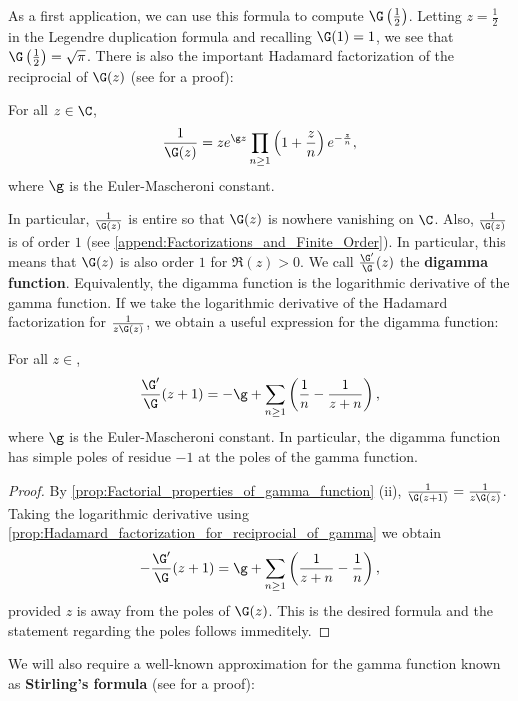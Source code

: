       As a first application, we can use this formula to compute $\G\left(\frac{1}{2}\right)$. Letting $z = \frac{1}{2}$ in the Legendre duplication formula and recalling $\G(1) = 1$, we see that $\G\left(\frac{1}{2}\right) = \sqrt{\pi}$. There is also the important Hadamard factorization of the reciprocial of $\G(z)$ (see \cite{stein2003complex} for a proof):

      \begin{proposition}\label{prop:Hadamard_factorization_for_reciprocial_of_gamma}
        For all $z \in \C$,
        \[
          \frac{1}{\G(z)} = ze^{\g z}\prod_{n \ge 1}\left(1+\frac{z}{n}\right)e^{-\frac{z}{n}},
        \]
        where $\g$ is the Euler-Mascheroni constant.
      \end{proposition}

      In particular, $\frac{1}{\G(z)}$ is entire so that $\G(z)$ is nowhere vanishing on $\C$. Also, $\frac{1}{\G(z)}$ is of order $1$ (see \cref{append:Factorizations_and_Finite_Order}). In particular, this means that $\G(z)$ is also order $1$ for $\Re(z) > 0$. We call $\frac{\G'}{\G}(z)$ the \textbf{digamma function}. Equivalently, the digamma function is the logarithmic derivative of the gamma function. If we take the logarithmic derivative of the Hadamard factorization for $\frac{1}{z\G(z)}$, we obtain a useful expression for the digamma function:

      \begin{corollary}\label{cor:logarithmic_derivative_of_gamma}
        For all $z \in$,
        \[
          \frac{\G'}{\G}(z+1) = -\g+\sum_{n \ge 1}\left(\frac{1}{n}-\frac{1}{z+n}\right),
        \]
        where $\g$ is the Euler-Mascheroni constant. In particular, the digamma function has simple poles of residue $-1$ at the poles of the gamma function.
      \end{corollary}
      \begin{proof}
        By \cref{prop:Factorial_properties_of_gamma_function} (ii), $\frac{1}{\G(z+1)} = \frac{1}{z\G(z)}$. Taking the logarithmic derivative using \cref{prop:Hadamard_factorization_for_reciprocial_of_gamma} we obtain
        \[
          -\frac{\G'}{\G}(z+1) = \g+\sum_{n \ge 1}\left(\frac{1}{z+n}-\frac{1}{n}\right),
        \]
        provided $z$ is away from the poles of $\G(z)$. This is the desired formula and the statement regarding the poles follows immeditely.
      \end{proof}
      
      We will also require a well-known approximation for the gamma function known as \textbf{Stirling's formula} (see \cite{remmert1998classical} for a proof):

